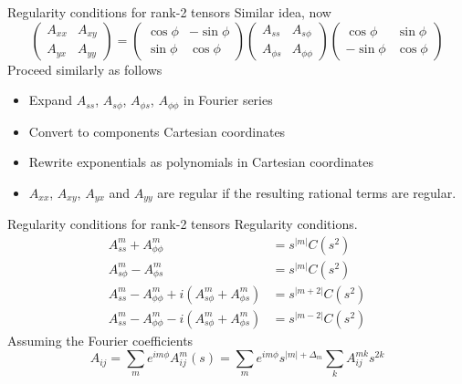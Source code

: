 \documentclass[11pt,aspectratio=169]{beamer}
\begin{document}
\begin{frame}{Regularity conditions for rank-2 tensors}
	Similar idea, now
	\[
    \begin{pmatrix} A_{xx} & A_{xy} \\ A_{yx} & A_{yy} \end{pmatrix} = 
    \begin{pmatrix} \cos\phi & -\sin\phi \\ \sin\phi & \cos\phi \end{pmatrix}
    \begin{pmatrix} A_{ss} & A_{s\phi} \\ A_{\phi s} & A_{\phi\phi} \end{pmatrix}
    \begin{pmatrix} \cos\phi & \sin\phi \\ -\sin\phi & \cos\phi \end{pmatrix}
	\]
	Proceed similarly as follows
	\begin{itemize}
		\item Expand $A_{ss}$, $A_{s\phi}$, $A_{\phi s}$, $A_{\phi\phi}$ in Fourier series
		\item Convert to components Cartesian coordinates
		\item Rewrite exponentials as polynomials in Cartesian coordinates
		\item $A_{xx}$, $A_{xy}$, $A_{yx}$ and $A_{yy}$ are regular if the resulting rational terms are regular.
	\end{itemize}
\end{frame}

\begin{frame}{Regularity conditions for rank-2 tensors}
	Regularity conditions.
	\[
		\begin{aligned}
			A_{ss}^m + A_{\phi\phi}^m &= s^{|m|} C(s^2) \\ 
			A_{s\phi}^m - A_{\phi s}^m &= s^{|m|} C(s^2) \\ 
			A_{ss}^m - A_{\phi\phi}^m + i \left(A_{s\phi}^m + A_{\phi s}^m\right) &= s^{|m+2|} C(s^2) \\ 
			A_{ss}^m - A_{\phi\phi}^m - i \left(A_{s\phi}^m + A_{\phi s}^m\right) &= s^{|m-2|} C(s^2)
		\end{aligned}
	\]
	Assuming the Fourier coefficients
	\[A_{ij} = \sum_m e^{im\phi} A_{ij}^{m}(s) = \sum_m e^{im\phi} s^{|m|+\Delta_m} \sum_k A_{ij}^{mk} s^{2k}\]
\end{frame}
\end{document}
